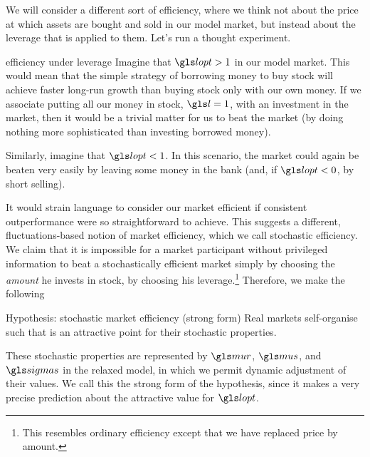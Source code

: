 We will consider a different sort of efficiency, where we think not about the price at which assets are bought and sold in our model market, but instead about the leverage that is applied to them. Let's run a thought experiment.

\begin{thoughtex}{efficiency under leverage}
Imagine that $\lopt>1$ in our model market. This would mean that the simple strategy of borrowing money to buy stock will achieve faster long-run growth than buying stock only with our own money. If we associate putting all our money in stock, $\l=1$, with an investment in the market, then it would be a trivial matter for us to beat the market (by doing nothing more sophisticated than investing borrowed money).

Similarly, imagine that $\lopt<1$. In this scenario, the market could again be beaten very easily by leaving some money in the bank (and, if $\lopt<0$, by short selling).
\end{thoughtex}

It would strain language to consider our market efficient if consistent outperformance were so straightforward to achieve. This suggests a different, fluctuations-based notion of market efficiency, which we call stochastic efficiency. We claim that it is impossible for a market participant without privileged information to beat a stochastically efficient market simply by choosing the \textit{amount} he invests in stock, \ie by choosing his leverage.\footnote{This resembles ordinary efficiency except that we have replaced price by amount.} Therefore, we make the following

\begin{keypts}{Hypothesis: stochastic market efficiency (strong form)}
Real markets self-organise such that
\be
{}
\ee
is an attractive point for their stochastic properties.
\end{keypts}

These stochastic properties are represented by $\mur$, $\mus$, and $\sigmas$ in the relaxed model, in which we permit dynamic adjustment of their values. We call this the strong form of the hypothesis, since it makes a very precise prediction about the attractive value for $\lopt$.

